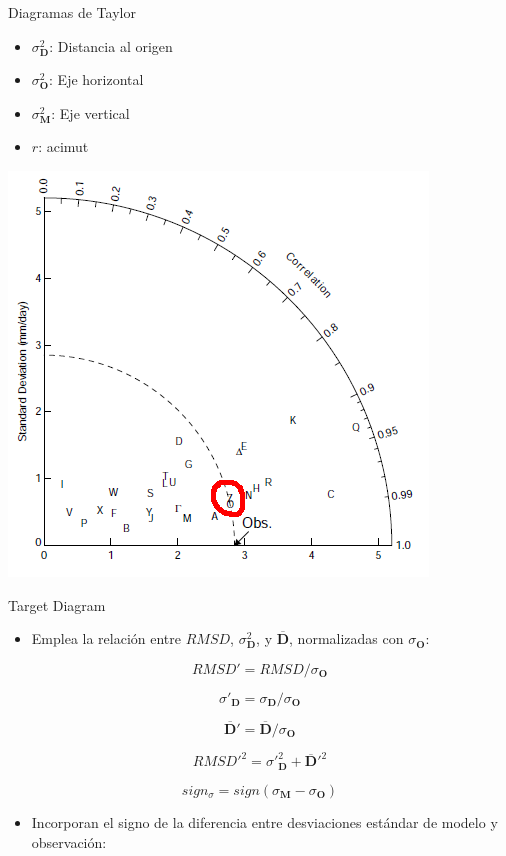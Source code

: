 \documentclass[xcolor={usenames,svgnames,dvipsnames}]{beamer}
\begin{document}
\begin{frame}[label={sec:org9b62f0d}]{Diagramas de Taylor}
\begin{itemize}
\item \(\sigma^2_{\mathbf{D}}\): Distancia al origen
\item \(\sigma^2_{\mathbf{O}}\): Eje horizontal
\item \(\sigma^2_{\mathbf{M}}\): Eje vertical
\item \(r\): acimut
\end{itemize}
\begin{center}
\begin{center}
\includegraphics[height=0.6\textheight]{../figs/TaylorDiagrama.png}
\end{center}
\end{center}
\end{frame}


\begin{frame}[label={sec:org5f74bd3}]{Target Diagram}
\begin{itemize}
\item Emplea la relación entre \(RMSD\), \(\sigma^2_{\mathbf{D}}\), y \(\overline{\mathbf{D}}\), normalizadas con \(\sigma_{\mathbf{O}}\):
\end{itemize}
\[
RMSD' = RMSD / \sigma_{\mathbf{O}}
\]

\[
  \sigma'_{\mathbf{D}} = \sigma_{\mathbf{D}} / \sigma_{\mathbf{O}} 
\]

\[
\overline{\mathbf{D}}' = \overline{\mathbf{D}} / \sigma_{\mathbf{O}}
\]

\[
RMSD'^2= \sigma'^2_{\mathbf{D}} + \overline{\mathbf{D}}'^2
\]

\[
sign_{\sigma} =  sign(\sigma_{\mathbf{M}} - \sigma_{\mathbf{O}} )
\]

\begin{itemize}
\item Incorporan el signo de la diferencia entre desviaciones estándar de modelo y observación:
\end{itemize}

\nocite{Jolliff.Kindle.ea2009}
\end{frame}
\end{document}
